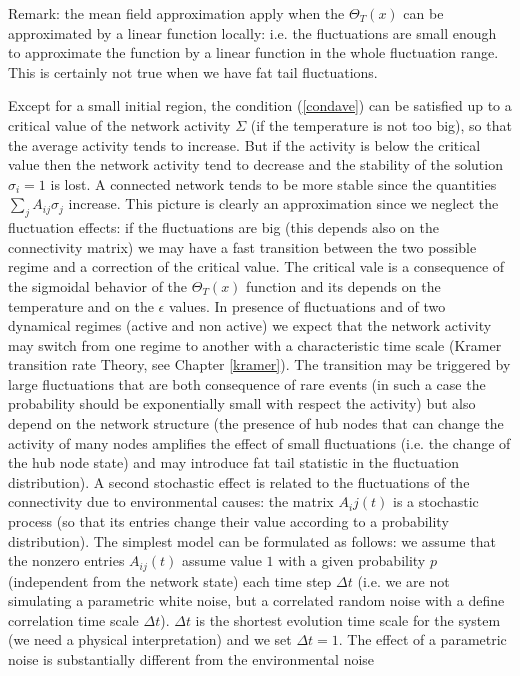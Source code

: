 Remark: the mean field approximation apply when the $\Theta_T(x)$ can be approximated by a linear function locally: i.e. the fluctuations are small
enough to approximate the function by a linear function in the whole fluctuation range. This is certainly not true when we have fat tail fluctuations.
\par\noindent
Except for a small initial region, the condition (\ref{condave}) can be satisfied up to a critical value of the network activity $\Sigma$ (if the temperature
is not too big), so that the average activity tends to increase. But if the activity is below the critical value then the network activity tend to decrease and
the stability of the solution $\sigma_i=1$ is lost. A connected network tends to be more stable since the quantities
$\sum_j A_{ij}\sigma_j$ increase.  This picture is clearly an approximation since we neglect the fluctuation effects: if the fluctuations are big (this
depends also on the connectivity matrix) we may have a fast transition between the two possible regime and a correction of the critical value. The
critical vale is a consequence of the sigmoidal behavior of the $\Theta_T(x)$ function and its depends on the temperature and on the $\epsilon$
values. In presence of fluctuations and of two dynamical regimes (active and non active) we expect that the network activity may switch from one regime
to another with a characteristic time scale (Kramer transition rate Theory, see Chapter \ref{kramer}). The transition may be triggered by large fluctuations that are both consequence
of rare events (in such a case the probability should be exponentially small with respect the activity) but also depend on the network structure (the presence of
hub nodes that can change the activity of many nodes amplifies the effect of small fluctuations (i.e. the change of the hub node state) and may introduce
fat tail statistic in the fluctuation distribution). A second stochastic effect is related to the fluctuations of the connectivity due to environmental causes: 
the matrix $A_ij(t)$ is a stochastic process (so that its entries change their value according to a probability distribution). The simplest model can be formulated as
follows: we assume that the nonzero entries $A_{ij}(t)$ assume value $1$ with a given probability $p$ (independent from the network state)
 each time step $\Delta t$ (i.e. we are not simulating
a parametric white noise, but a correlated random noise with a define correlation time scale $\Delta t$). $\Delta t$ is the shortest evolution time scale
for the system (we need a physical interpretation) and we set $\Delta t=1$. The effect of a parametric noise is substantially different from the environmental noise
